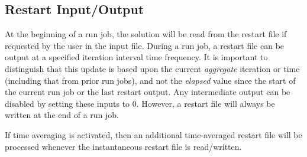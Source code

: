\subsection{Restart Input\slash Output}
\label{SEC:Files:Restart_Input_Output}


At the beginning of a run job, the solution will be read from the
restart file if requested by the user in the input file.
%
During a run job, a restart file can be output at a specified
iteration interval \andor time frequency.
%
It is important to distinguish that
this update is based upon the current {\em aggregate} iteration or time
(including that from prior run jobs),
and not the {\em elapsed} value since the start of the current
run job or the last restart output.
%
Any intermediate output can be disabled by setting these inputs
to 0.
%
However, a restart file will always be written at the end of a
run job.


If time averaging is activated, then an additional time-averaged restart file
will be processed whenever the instantaneous restart file is read/written.






